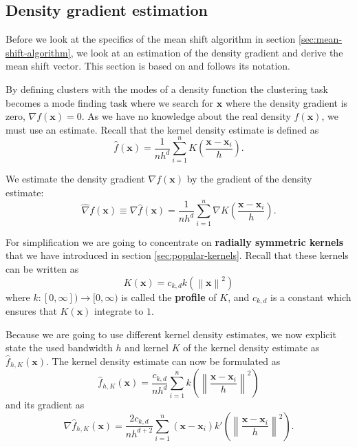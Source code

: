 \documentclass{article}
\newcommand{\norm}[1]{\left\lVert#1\right\rVert}
\begin{document}
\subsection{Density gradient estimation} \label{sec:density-gradient-estimation}

Before we look at the specifics of the mean shift algorithm in section \ref{sec:mean-shift-algorithm}, we look at an estimation of the density gradient and derive the mean shift vector. This section is based on \cite{Comaniciu.2002} and follows its notation.

By defining clusters with the modes of a density function the clustering task becomes a mode finding task where we search for $\bm{x}$ where the density gradient is zero, $\nabla f(\bm{x}) = 0$. As we have no knowledge about the real density $f(\bm{x})$, we must use an estimate. Recall that the kernel density estimate is defined as
\begin{equation}
	\hat{f}(\bm{x}) = \frac{1}{nh^d} \sum_{i=1}^n K\left(\frac{\bm{x} - \bm{x}_i}{h} \right)\text{.}
\end{equation}

We estimate the density gradient $\nabla f(\bm{x})$ by the gradient of the density estimate:
\begin{equation}
	\hat\nabla f(\bm{x}) \equiv \nabla \hat{f}(\bm{x}) = \frac{1}{nh^d} \sum_{i=1}^n \nabla K\left(\frac{\bm{x} - \bm{x}_i}{h} \right)\text{.}
\end{equation}

For simplification we are going to concentrate on \textbf{radially symmetric kernels} that we have introduced in section \ref{sec:popular-kernels}. Recall that these kernels can be written as
\begin{equation}
	K(\bm{x}) = c_{k,d} k(\norm{\bm{x}}^2)
\end{equation}
where $k : [0, \infty]) \rightarrow [0, \infty)$ is called the \textbf{profile} of $K$, and $c_{k,d}$ is a constant which ensures that $K(\bm{x})$ integrate to $1$.

Because we are going to use different kernel density estimates, we now explicit state the used bandwidth $h$ and kernel $K$ of the kernel density estimate as $\hat{f}_{h,K}(\bm{x})$. The kernel density estimate can now be formulated as
\begin{equation}
	\hat{f}_{h,K}(\bm{x}) = \frac{c_{k,d}}{nh^d} \sum_{i=1}^n k\left(\norm{\frac{\bm{x} - \bm{x}_i}{h}}^2 \right)
\end{equation}
and its gradient as
\begin{equation}
	\nabla \hat{f}_{h,K}(\bm{x}) = \frac{2c_{k,d}}{nh^{d+2}} \sum_{i=1}^n (\bm{x} - \bm{x}_i)k'\left(\norm{\frac{\bm{x} - \bm{x}_i}{h}}^2 \right)\text{.}
\end{equation}
\end{document}
